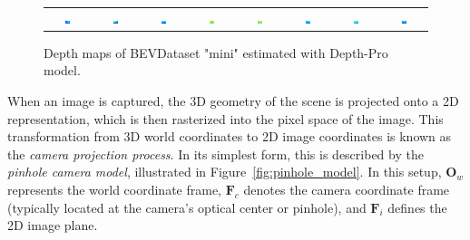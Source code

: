 \begin{figure}[h!]
\begin{tabular}{c c c c c c c c}
        \includegraphics[width=0.12\textwidth]{images/methodology/depth_images/colored_depth_map_0.png} & 
        \includegraphics[width=0.12\textwidth]{images/methodology/depth_images/colored_depth_map_1.png} & 
        \includegraphics[width=0.12\textwidth]{images/methodology/depth_images/colored_depth_map_2.png} &
        \includegraphics[width=0.12\textwidth]{images/methodology/depth_images/colored_depth_map_3.png} &
        \includegraphics[width=0.12\textwidth]{images/methodology/depth_images/colored_depth_map_4.png} &   
        \includegraphics[width=0.12\textwidth]{images/methodology/depth_images/colored_depth_map_5.png} & 
        \includegraphics[width=0.12\textwidth]{images/methodology/depth_images/colored_depth_map_6.png} &
        \includegraphics[width=0.12\textwidth]{images/methodology/depth_images/colored_depth_map_7.png} \\
    \end{tabular}    
    \caption{Depth maps of BEVDataset "mini" estimated with Depth-Pro model.}
    \label{fig:depth_images}
\end{figure}

When an image is captured, the 3D geometry of the scene is projected onto a 2D representation, which is then rasterized into the pixel space of the image. This transformation from 3D world coordinates to 2D image coordinates is known as the \emph{camera projection process}. In its simplest form, this is described by the \emph{pinhole camera model}, illustrated in Figure~\ref{fig:pinhole_model}. In this setup, $\mathbf{O}_w$ represents the world coordinate frame, $\mathbf{F}_c$ denotes the camera coordinate frame (typically located at the camera's optical center or pinhole), and $\mathbf{F}_i$ defines the 2D image plane.

